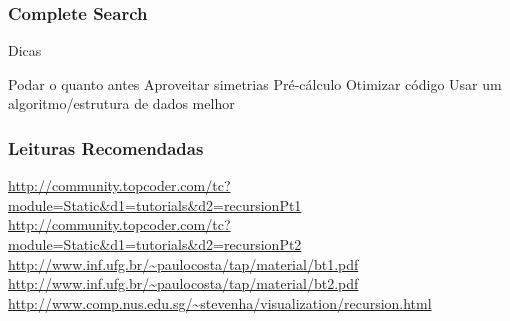 \begin{frame}
\frametitle{Complete Search}
\begin{block}{Dicas}
\begin{itemize}[<+->]
	\bitem Podar o quanto antes
	\bitem Aproveitar simetrias
	\bitem Pré-cálculo
	\bitem Otimizar código
	\bitem Usar um algoritmo/estrutura de dados melhor
\end{itemize}
\end{block}
\end{frame}

\begin{frame}
\frametitle{Leituras Recomendadas}

\begin{block}{}
\begin{itemize}
\scriptsize
	\bitem \url{http://community.topcoder.com/tc?module=Static&d1=tutorials&d2=recursionPt1}
	\bitem \url{http://community.topcoder.com/tc?module=Static&d1=tutorials&d2=recursionPt2}
	\bitem \url{http://www.inf.ufg.br/~paulocosta/tap/material/bt1.pdf}
	\bitem \url{http://www.inf.ufg.br/~paulocosta/tap/material/bt2.pdf}
	\bitem \url{http://www.comp.nus.edu.sg/~stevenha/visualization/recursion.html}
\end{itemize}
\end{block}

\end{frame}
